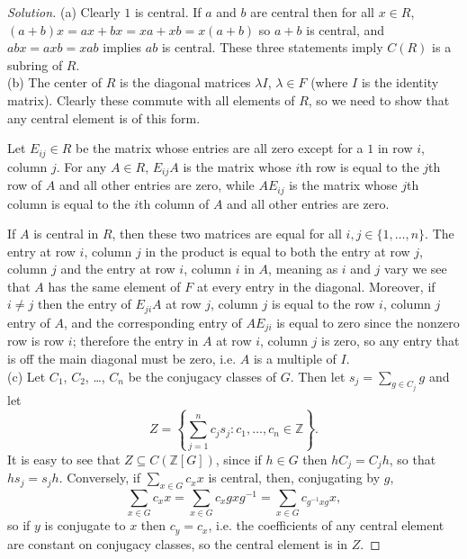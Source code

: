 \documentclass[10pt]{article}
\providecommand{\ZZ}{\mathbb Z}
\providecommand{\inv}{^{-1}}
\newenvironment{soln}{\begin{proof}[Solution]}{\end{proof}}
\begin{document}
\begin{soln}
    (a) Clearly $1$ is central. If $a$ and $b$ are central then
    for all $x\in R$, $(a + b)x = ax + bx = xa + xb = x(a + b)$
    so $a + b$ is central, and $abx = axb = xab$ implies $ab$ is central.
    These three statements imply $C(R)$ is a subring of $R$.
    \\

    (b) The center of $R$ is the diagonal matrices $\lambda I$, $\lambda\in F$
    (where $I$ is the identity matrix). Clearly these commute with all elements of $R$,
    so we need to show that any central element is of this form.

    Let $E_{ij}\in R$ be the matrix whose entries are all zero
    except for a $1$ in row $i$, column $j$. For any $A\in R$,
    $E_{ij}A$ is the matrix whose $i$th row is equal to the $j$th row of $A$
    and all other entries are zero,
    while $AE_{ij}$ is the matrix whose $j$th column is equal to
    the $i$th column of $A$ and all other entries are zero.

    If $A$ is central in $R$, then
    these two matrices are equal for all $i,j\in\{1,\dots,n\}$.
    The entry at row $i$, column $j$ in the product is equal to both
    the entry at row $j$, column $j$ and the entry at row $i$, column $i$
    in $A$, meaning as $i$ and $j$ vary we see that
    $A$ has the same element of $F$ at every entry in the diagonal.
    Moreover, if $i\ne j$ then the entry of $E_{ji}A$
    at row $j$, column $j$ is equal to the row $i$, column $j$ entry of $A$,
    and the corresponding entry of $AE_{ji}$ is equal to zero
    since the nonzero row is row $i$; therefore the entry in $A$
    at row $i$, column $j$ is zero, so any entry that is
    off the main diagonal must be zero, i.e. $A$ is a multiple of $I$.
    \\

    (c) Let $C_1$, $C_2$, \dots, $C_n$ be the conjugacy classes of $G$.
    Then let $s_j = \sum_{g\in C_j} g$ and let
    \begin{equation*}
	Z = \left\{\sum_{j=1}^n c_js_j : c_1,\dots,c_n\in\ZZ\right\}.
    \end{equation*}
    It is easy to see that $Z\subseteq C(\ZZ[G])$, since
    if $h\in G$ then $hC_j = C_jh$, so that $hs_j = s_jh$.
    Conversely, if $\sum_{x\in G} c_xx$ is central, then, conjugating by $g$,
    \begin{equation*}
	\sum_{x\in G} c_xx
	= \sum_{x\in G} c_x gxg\inv
	= \sum_{x\in G} c_{g\inv xg} x,
    \end{equation*}
    so if $y$ is conjugate to $x$ then $c_y = c_x$, i.e.
    the coefficients of any central element
    are constant on conjugacy classes,
    so the central element is in $Z$.
\end{soln}
\end{document}
